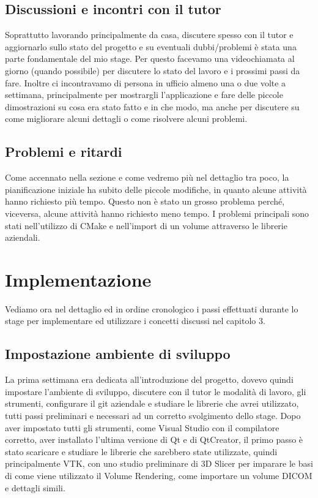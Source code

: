 \subsection{Discussioni e incontri con il tutor}
Soprattutto lavorando principalmente da casa, discutere spesso con il tutor e aggiornarlo sullo stato del progetto e su eventuali dubbi/problemi è stata una parte fondamentale del mio stage. Per questo facevamo una videochiamata al giorno (quando possibile) per discutere lo stato del lavoro e i prossimi passi da fare. Inoltre ci incontravamo di persona in ufficio almeno una o due volte a settimana, principalmente per mostrargli l'applicazione e fare delle piccole dimostrazioni su cosa era stato fatto e in che modo, ma anche per discutere su come migliorare alcuni dettagli o come risolvere alcuni problemi.

\subsection{Problemi e ritardi}
Come accennato nella sezione  e come vedremo più nel dettaglio tra poco, la pianificazione iniziale ha subito delle piccole modifiche, in quanto alcune attività hanno richiesto più tempo. Questo non è stato un grosso problema perché, viceversa, alcune attività hanno richiesto meno tempo. I problemi principali sono stati nell'utilizzo di CMake e nell'import di un volume attraverso le librerie aziendali.

\section{Implementazione}
Vediamo ora nel dettaglio ed in ordine cronologico i passi effettuati durante lo stage per implementare ed utilizzare i concetti discussi nel capitolo 3.

\subsection{Impostazione ambiente di sviluppo}
La prima settimana era dedicata all'introduzione del progetto, dovevo quindi impostare l'ambiente di sviluppo, discutere con il tutor le modalità di lavoro, gli strumenti, configurare il git aziendale e studiare le librerie che avrei utilizzato, tutti passi preliminari e necessari ad un corretto svolgimento dello stage.
Dopo aver impostato tutti gli strumenti, come Visual Studio con il compilatore corretto, aver installato l'ultima versione di Qt e di QtCreator, il primo passo è stato scaricare e studiare le librerie che sarebbero state utilizzate, quindi principalmente VTK, con uno studio preliminare di 3D Slicer per imparare le basi di come viene utilizzato il Volume Rendering, come importare un volume DICOM e dettagli simili. 

